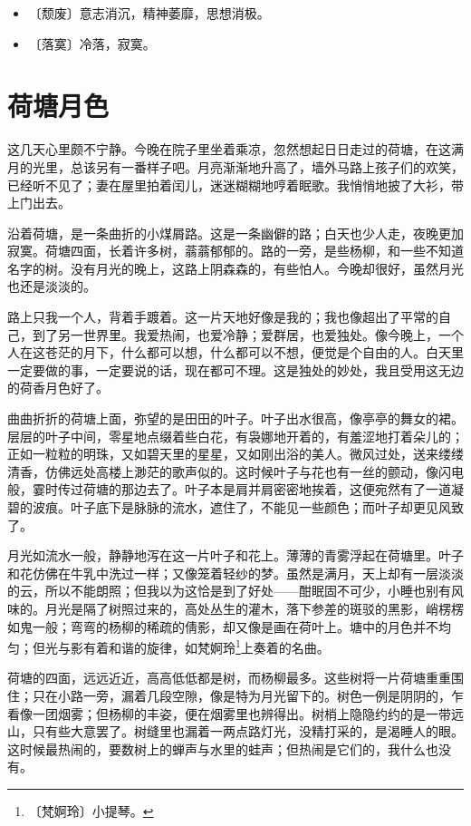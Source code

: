 \documentclass[12pt,UTF-8,openany]{ctexbook}
\begin{document}
\begin{itemize}
    \setlength\itemsep{-0.2em}
    \item 〔颓废〕意志消沉，精神萎靡，思想消极。
    \item 〔落寞〕冷落，寂寞。
\end{itemize}

\chapter{荷塘月色}

\begin{large}
    
    这几天心里颇不宁静。今晚在院子里坐着乘凉，忽然想起日日走过的荷塘，在这满月的光里，总该另有一番样子吧。月亮渐渐地升高了，墙外马路上孩子们的欢笑，已经听不见了；妻在屋里拍着闰儿，迷迷糊糊地哼着眠歌。我悄悄地披了大衫，带上门出去。
    
    沿着荷塘，是一条曲折的小煤屑路。这是一条幽僻的路；白天也少人走，夜晚更加寂寞。荷塘四面，长着许多树，蓊蓊郁郁的。路的一旁，是些杨柳，和一些不知道名字的树。没有月光的晚上，这路上阴森森的，有些怕人。今晚却很好，虽然月光也还是淡淡的。
    
    路上只我一个人，背着手踱着。这一片天地好像是我的；我也像超出了平常的自己，到了另一世界里。我爱热闹，也爱冷静；爱群居，也爱独处。像今晚上，一个人在这苍茫的月下，什么都可以想，什么都可以不想，便觉是个自由的人。白天里一定要做的事，一定要说的话，现在都可不理。这是独处的妙处，我且受用这无边的荷香月色好了。
    
    曲曲折折的荷塘上面，弥望的是田田的叶子。叶子出水很高，像亭亭的舞女的裙。层层的叶子中间，零星地点缀着些白花，有袅娜地开着的，有羞涩地打着朵儿的；正如一粒粒的明珠，又如碧天里的星星，又如刚出浴的美人。微风过处，送来缕缕清香，仿佛远处高楼上渺茫的歌声似的。这时候叶子与花也有一丝的颤动，像闪电般，霎时传过荷塘的那边去了。叶子本是肩并肩密密地挨着，这便宛然有了一道凝碧的波痕。叶子底下是脉脉的流水，遮住了，不能见一些颜色；而叶子却更见风致了。
    
    月光如流水一般，静静地泻在这一片叶子和花上。薄薄的青雾浮起在荷塘里。叶子和花仿佛在牛乳中洗过一样；又像笼着轻纱的梦。虽然是满月，天上却有一层淡淡的云，所以不能朗照；但我以为这恰是到了好处——酣眠固不可少，小睡也别有风味的。月光是隔了树照过来的，高处丛生的灌木，落下参差的斑驳的黑影，峭楞楞如鬼一般；弯弯的杨柳的稀疏的倩影，却又像是画在荷叶上。塘中的月色并不均匀；但光与影有着和谐的旋律，如梵婀玲\footnote{〔梵婀玲〕小提琴。}上奏着的名曲。
    
    荷塘的四面，远远近近，高高低低都是树，而杨柳最多。这些树将一片荷塘重重围住；只在小路一旁，漏着几段空隙，像是特为月光留下的。树色一例是阴阴的，乍看像一团烟雾；但杨柳的丰姿，便在烟雾里也辨得出。树梢上隐隐约约的是一带远山，只有些大意罢了。树缝里也漏着一两点路灯光，没精打采的，是渴睡人的眼。这时候最热闹的，要数树上的蝉声与水里的蛙声；但热闹是它们的，我什么也没有。
    

\end{large}
\end{document}
